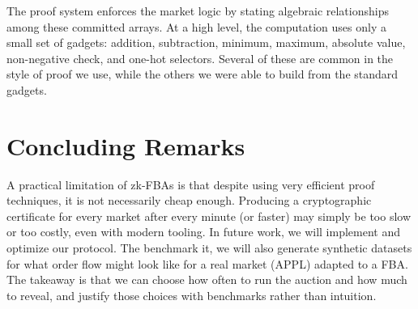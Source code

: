 \documentclass[runningheads]{llncs}
\begin{document}
The proof system enforces the market logic by stating algebraic relationships among these committed arrays. At a high level, the computation uses only a small set of gadgets: addition, subtraction, minimum, maximum, absolute value, non-negative check, and one-hot selectors. Several of these are common in the style of proof we use, while the others we were able to build from the standard gadgets.

\section{Concluding Remarks}

A practical limitation of zk-FBAs is that despite using very efficient proof techniques, it is not necessarily cheap enough. Producing a cryptographic certificate for every market after every minute (or faster) may simply be too slow or too costly, even with modern tooling. In future work, we will implement and optimize our protocol. The benchmark it, we will also generate synthetic datasets for what order flow might look like for a real market (\eg APPL) adapted to a FBA. The takeaway is that we can choose how often to run the auction and how much to reveal, and justify those choices with benchmarks rather than intuition.





\end{document}

